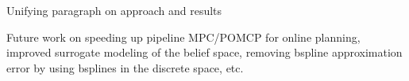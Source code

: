 Unifying paragraph on approach and results

Future work on speeding up pipeline MPC/POMCP for online planning, improved surrogate modeling of the belief space, removing bspline approximation error by using bsplines in the discrete space, etc.



